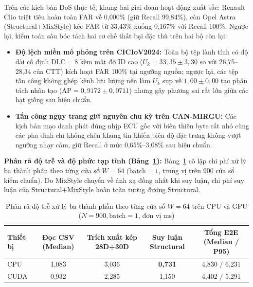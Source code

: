 \documentclass[12pt, a4paper, reqno, oneside]{book}
\begin{document}
Trên các kịch bản DoS thực tế, khung hai giai đoạn hoạt động xuất sắc: Renault Clio triệt tiêu hoàn toàn FAR về 0,000\% (giữ Recall 99,84\%), còn Opel Astra (Structural+MixStyle) kéo FAR từ 33,43\% xuống 0,167\% với Recall 100\%. Ngược lại, kiểm toán sâu bóc tách hai cơ chế thất bại đặc thù trên hai bộ còn lại:
\begin{itemize}
  \item \textbf{Độ lệch miền mô phỏng trên CICIoV2024:} Toàn bộ tệp lành tính có độ dài cố định $\text{DLC}=8$ kèm mật độ ID cao ($U_k = 33{,}35 \pm 3{,}30$ so với 26,75--28,34 của CTT) kích hoạt FAR 100\% tại ngưỡng nguồn; ngược lại, các tệp tấn công không ghép kênh lưu lượng nền làm $U_k$ sụp về $1{,}00 \pm 0{,}00$ tạo phân tách nhân tạo ($\text{AP} = 0{,}9172 \pm 0{,}0711$) nhưng gây phương sai rất lớn giữa các hạt giống sau hiệu chuẩn.
  \item \textbf{Tấn công ngụy trang giữ nguyên chu kỳ trên CAN-MIRGU:} Các kịch bản mạo danh phát đúng nhịp ECU gốc với biến thiên byte rất nhỏ cùng các pha đình chỉ không chèn khung tin khiến biên độ đặc trưng không vượt ngưỡng nhạy cảm, giữ Recall ở mức 0,65\%--3,08\% sau hiệu chuẩn.
\end{itemize}

\textbf{Phân rã độ trễ và độ phức tạp tĩnh (Bảng~\ref{tab:runtime-breakdown}):} Bảng~\ref{tab:runtime-breakdown} cô lập chi phí xử lý ba thành phần theo từng cửa sổ $W=64$ ($\text{batch}=1$, trung vị trên 900 cửa sổ kiểm chuẩn). Do MixStyle chuyển về ánh xạ đồng nhất khi suy luận, chi phí suy luận của Structural+MixStyle hoàn toàn tương đương Structural.

\begin{table}[htbp]
  \centering
  \caption[Phân rã độ trễ xử lý ba thành phần theo cửa sổ $W=64$ trên CPU và GPU]{Phân rã độ trễ xử lý ba thành phần theo từng cửa sổ $W=64$ trên CPU và GPU ($N=900, \text{batch}=1$, đơn vị ms)}
  \label{tab:runtime-breakdown}
  \footnotesize
  \begin{tabular}{@{}l c c c c@{}}
    \toprule
    \textbf{Thiết bị} & \textbf{Đọc CSV (Median)} & \textbf{Trích xuất kép 28D+30D} & \textbf{Suy luận Structural} & \textbf{Tổng E2E (Median / P95)} \\
    \midrule
    CPU & 1,083 & 3,036 & \textbf{0,731} & 4,830 / 6,231 \\
    CUDA & 0,932 & 2,285 & 1,150 & 4,402 / 5,291 \\
    \bottomrule
  \end{tabular}
\end{table}
\end{document}
